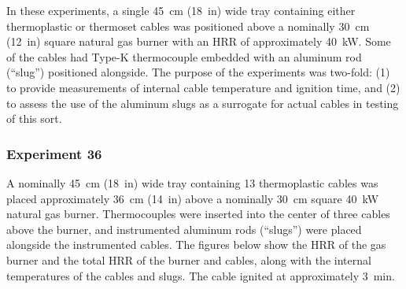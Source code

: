 In these experiments, a single 45~cm (18~in) wide tray containing either thermoplastic or thermoset cables was positioned above a nominally 30~cm (12~in) square natural gas burner with an HRR of approximately 40~kW. Some of the cables had Type-K thermocouple embedded with an aluminum rod (``slug'') positioned alongside. The purpose of the experiments was two-fold: (1) to provide measurements of internal cable temperature and ignition time, and (2) to assess the use of the aluminum slugs as a surrogate for actual cables in testing of this sort.



\clearpage

\subsubsection{Experiment 36}

A nominally 45~cm (18~in) wide tray containing 13 thermoplastic cables was placed approximately 36~cm (14~in) above a nominally 30~cm square 40~kW natural gas burner. Thermocouples were inserted into the center of three cables above the burner, and instrumented aluminum rods (``slugs'') were placed alongside the instrumented cables. The figures below show the HRR of the gas burner and the total HRR of the burner and cables, along with the internal temperatures of the cables and slugs. The cable ignited at approximately 3~min.


